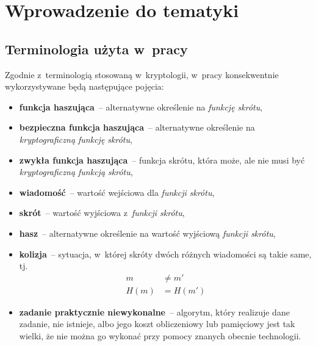 \documentclass[12pt,a4paper,twoside]{article}
\begin{document}
\newpage



\section{Wprowadzenie do tematyki}



\subsection{Terminologia użyta w~pracy}
Zgodnie z~terminologią stosowaną w~kryptologii, w~pracy konsekwentnie
wykorzystywane będą następujące pojęcia:

\begin{itemize}

    \item \textbf{funkcja haszująca}~-- alternatywne określenie na
    \emph{funkcję skrótu},

    \item \textbf{bezpieczna funkcja haszująca}~-- alternatywne określenie na
    \emph{kryptograficzną funkcję skrótu},

    \item \textbf{zwykła funkcja haszująca}~-- funkcja skrótu, która może, ale
    nie musi być \emph{kryptograficzną funkcją skrótu},

    \item \textbf{wiadomość}~-- wartość wejściowa dla \emph{funkcji skrótu},

    \item \textbf{skrót}~-- wartość wyjściowa z~\emph{funkcji skrótu},

    \item \textbf{hasz}~-- alternatywne określenie na wartość wyjściową
    \emph{funkcji skrótu},

    \item \textbf{kolizja}~-- sytuacja, w~której skróty dwóch różnych
    wiadomości są takie same, tj.
    \[
        \begin{aligned}
        m &\neq m' \\
        H(m) &= H(m')
        \end{aligned}
    \]

    \item \textbf{zadanie praktycznie niewykonalne}~-- algorytm, który
    realizuje dane zadanie, nie istnieje, albo jego koszt obliczeniowy lub
    pamięciowy jest tak wielki, że nie można go wykonać przy pomocy znanych
    obecnie technologii.

\end{itemize}
\end{document}
